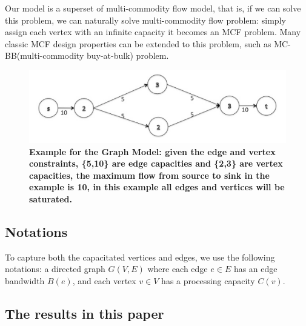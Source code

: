 \documentclass[11pt]{article}
\begin{document}
Our model is a superset of multi-commodity flow model\cite{MCF}, that is, if we can solve this problem, we can naturally solve multi-commodity flow problem: simply assign each vertex with an infinite capacity it becomes an MCF problem. Many classic MCF design properties can be extended to this problem, such as MC-BB(multi-commodity buy-at-bulk) problem\cite{BuyAtBulk,Charikar05,Chekuri2007}. 

\begin{figure}[h]
\includegraphics[width=\linewidth]{picture1.png} 
\caption{ \textbf{Example for the Graph Model: given the edge and vertex constraints, \textnormal{\{5,10\} }are edge capacities and \{2,3\} are vertex capacities, the maximum flow from source to sink in the example is 10, in this example all edges and vertices will be saturated.} }
 \end{figure}
\subsection{Notations}
To capture both the capacitated vertices and edges, we use the following notations:
a directed graph $G(V,E)$ where each edge $e\in E$ has an edge bandwidth $B(e)$, and each vertex $v\in V$ has a processing capacity $C(v)$. 

 


\subsection{The results in this paper}













\end{document}
